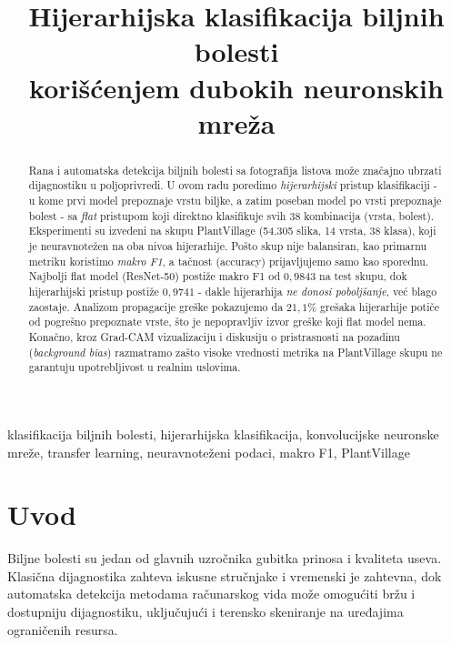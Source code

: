 \documentclass[conference]{IEEEtran}
\begin{document}
\title{Hijerarhijska klasifikacija biljnih bolesti\\
korišćenjem dubokih neuronskih mreža}

\author{
}

\maketitle

\begin{abstract}
Rana i automatska detekcija biljnih bolesti sa fotografija listova može značajno
ubrzati dijagnostiku u poljoprivredi. U ovom radu poredimo \emph{hijerarhijski}
pristup klasifikaciji - u kome prvi model prepoznaje vrstu biljke, a zatim
poseban model po vrsti prepoznaje bolest - sa \emph{flat} pristupom koji
direktno klasifikuje svih 38 kombinacija (vrsta, bolest). Eksperimenti su
izvedeni na skupu PlantVillage (54.305 slika, 14 vrsta, 38 klasa), koji je
neuravnotežen na oba nivoa hijerarhije. Pošto skup nije balansiran, kao primarnu
metriku koristimo \emph{makro F1}, a tačnost (accuracy) prijavljujemo samo kao
sporednu. Najbolji flat model (ResNet-50) postiže makro F1 od $0{,}9843$ na test
skupu, dok hijerarhijski pristup postiže $0{,}9741$ - dakle hijerarhija
\emph{ne donosi poboljšanje}, već blago zaostaje. Analizom propagacije greške
pokazujemo da $21{,}1\%$ grešaka hijerarhije potiče od pogrešno prepoznate vrste,
što je nepopravljiv izvor greške koji flat model nema. Konačno, kroz Grad-CAM
vizualizaciju i diskusiju o pristrasnosti na pozadinu (\emph{background bias})
razmatramo zašto visoke vrednosti metrika na PlantVillage skupu ne garantuju
upotrebljivost u realnim uslovima.
\end{abstract}

\begin{IEEEkeywords}
klasifikacija biljnih bolesti, hijerarhijska klasifikacija, konvolucijske
neuronske mreže, transfer learning, neuravnoteženi podaci, makro F1, PlantVillage
\end{IEEEkeywords}

\section{Uvod}
Biljne bolesti su jedan od glavnih uzročnika gubitka prinosa i kvaliteta useva.
Klasična dijagnostika zahteva iskusne stručnjake i vremenski je zahtevna, dok
automatska detekcija metodama računarskog vida može omogućiti bržu i dostupniju
dijagnostiku, uključujući i terensko skeniranje na uređajima ograničenih resursa.
\end{document}
